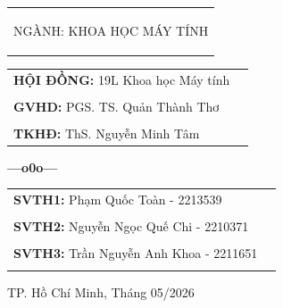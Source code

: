 \documentclass[a4paper]{article}
\theoremstyle{definition}
\begin{document}
\begin{titlepage}
\begin{center}
\begin{tabular}{p{14cm}}
      \begin{center}
        {\Large NGÀNH: KHOA HỌC MÁY TÍNH}
      \end{center}
    \end{tabular}
  \end{center}

  \begin{center}
    \begin{tabular}{ll}
      \textbf{\Large HỘI ĐỒNG:} {\Large 19L Khoa học Máy tính}
      \\
      \\
      \textbf{\Large GVHD:} {\Large PGS. TS. Quản Thành Thơ}
      \\
      \\
      \textbf{\Large TKHĐ:} {\Large ThS. Nguyễn Minh Tâm}
    \end{tabular}
  \end{center}

  \begin{center}
    \textbf{\Large ---o0o---}
  \end{center}

  \begin{center}
    \begin{tabular}{ll}
      \textbf{\Large SVTH1:} {\Large Phạm Quốc Toàn - 2213539}
      \\
      \\
      \textbf{\Large SVTH2:}  {\Large Nguyễn Ngọc Quế Chi - 2210371}
      \\
      \\
      \textbf{\Large SVTH3:}  {\Large Trần Nguyễn Anh Khoa - 2211651}
      \\
      \\
    \end{tabular}
  \end{center}
  \vspace{0.5cm}





  \begin{center}
    {\Large TP. Hồ Chí Minh, Tháng 05/2026}
  \end{center}
\end{titlepage}
\newpage
\clearpage
\thispagestyle{empty}
\mbox{}
\clearpage
\end{document}

